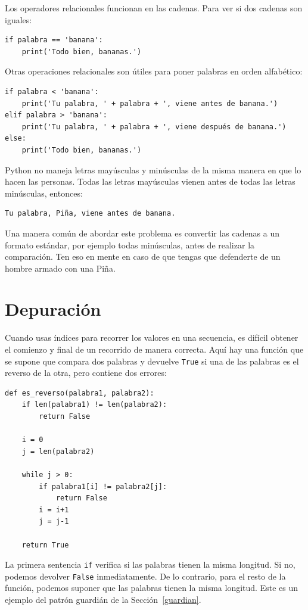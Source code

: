 \documentclass[10pt]{book}
\begin{document}
Los operadores relacionales funcionan en las cadenas.  Para ver si dos cadenas son iguales:

\begin{verbatim}
if palabra == 'banana':
    print('Todo bien, bananas.')
\end{verbatim}
%
Otras operaciones relacionales son útiles para poner palabras en orden
alfabético:

\begin{verbatim}
if palabra < 'banana':
    print('Tu palabra, ' + palabra + ', viene antes de banana.')
elif palabra > 'banana':
    print('Tu palabra, ' + palabra + ', viene después de banana.')
else:
    print('Todo bien, bananas.')
\end{verbatim}
%
Python no maneja letras mayúsculas y minúsculas de la misma manera en que
lo hacen las personas.  Todas las letras mayúsculas vienen antes de todas las
letras minúsculas, entonces:

\begin{verbatim}
Tu palabra, Piña, viene antes de banana.
\end{verbatim}
%
Una manera común de abordar este problema es convertir las cadenas a un
formato estándar, por ejemplo todas minúsculas, antes de realizar
la comparación.  Ten eso en mente en caso de que tengas que defenderte
de un hombre armado con una Piña.


\section{Depuración}

Cuando usas índices para recorrer los valores en una secuencia,
es difícil obtener el comienzo y final de un recorrido
de manera correcta.  Aquí hay una función que se supone que compara dos
palabras y devuelve {\tt True} si una de las palabras es el reverso
de la otra, pero contiene dos errores:

\begin{verbatim}
def es_reverso(palabra1, palabra2):
    if len(palabra1) != len(palabra2):
        return False

    i = 0
    j = len(palabra2)

    while j > 0:
        if palabra1[i] != palabra2[j]:
            return False
        i = i+1
        j = j-1

    return True
\end{verbatim}
%
La primera sentencia {\tt if} verifica si las palabras tienen la
misma longitud.  Si no, podemos devolver {\tt False} inmediatamente.
De lo contrario, para el resto de la función, podemos suponer que las palabras
tienen la misma longitud.  Este es un ejemplo del patrón guardián
de la Sección~\ref{guardian}.
\end{document}
